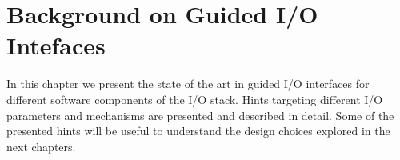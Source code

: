 \chapter{Background on Guided I/O Intefaces}
In this chapter we present the state of the art in guided I/O interfaces for different software components of the I/O stack. Hints targeting different I/O parameters and mechanisms are presented and described in detail. Some of the presented hints will be useful to understand the design choices explored in the next chapters.




